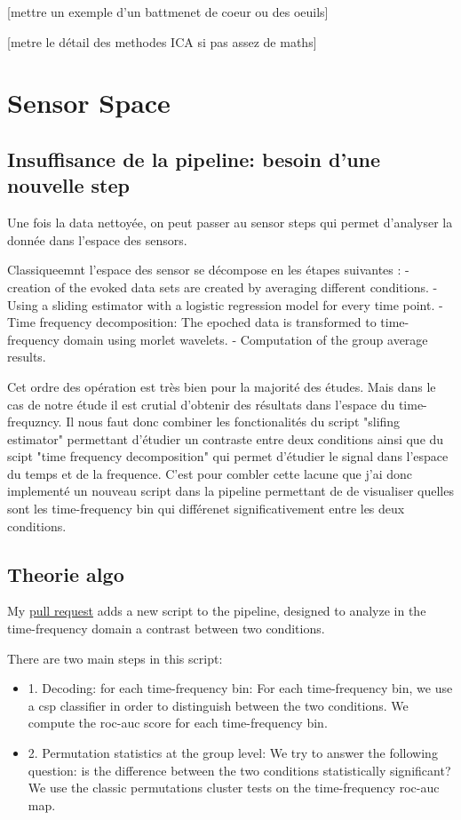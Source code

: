 [mettre un exemple d'un battmenet de coeur ou des oeuils]

[metre le détail des methodes ICA si pas assez de maths]


\section{Sensor Space}

\subsection{Insuffisance de la pipeline: besoin d'une nouvelle step}

Une fois la data nettoyée, on peut passer au sensor steps qui permet d'analyser la donnée dans l'espace des sensors.

Classiqueemnt l'espace des sensor se décompose en les étapes suivantes : 
- creation of the evoked data sets are created by averaging different conditions.
- Using a sliding estimator with a logistic regression model for every time point.
- Time frequency decomposition: The epoched data is transformed to time-frequency domain using morlet wavelets.
- Computation of the group average results.

Cet ordre des opération est très bien pour la majorité des études. Mais dans le cas de notre étude il est crutial d'obtenir des résultats dans l'espace du time-frequzncy. Il nous faut donc combiner les fonctionalités du script "slifing estimator" permettant d'étudier un contraste entre deux conditions ainsi que du scipt "time frequency decomposition" qui permet d'étudier le signal dans l'espace du temps et de la frequence. C'est pour combler cette lacune que j'ai donc implementé un nouveau script dans la pipeline permettant de de visualiser quelles sont les time-frequency bin qui différenet significativement entre les deux conditions.


\subsection{Theorie algo}
My \href{https://github.com/mne-tools/mne-bids-pipeline/pull/414}{pull request} adds a new script to the pipeline, designed to analyze in the time-frequency domain a contrast between two conditions.

There are two main steps in this script:

\begin{itemize}
    \item 1. Decoding: for each time-frequency bin: For each time-frequency bin, we use a csp classifier in order to distinguish between the two conditions. We compute the roc-auc score for each time-frequency bin.
    \item 2. Permutation statistics at the group level: We try to answer the following question: is the difference between the two conditions statistically significant? We use the classic permutations cluster tests on the time-frequency roc-auc map.
\end{itemize}


